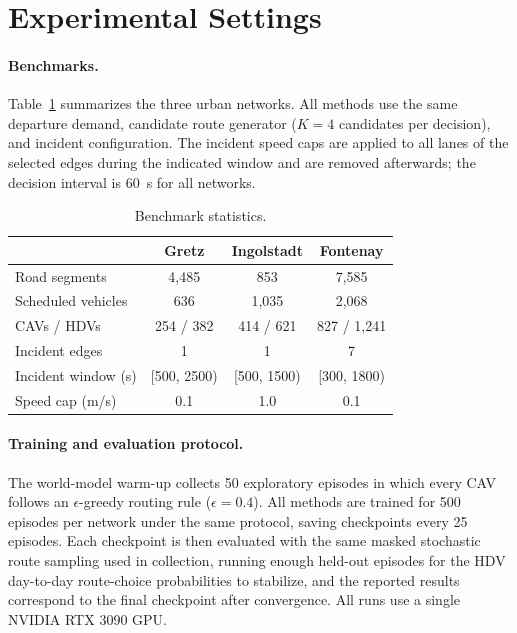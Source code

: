 

\section{Experimental Settings}
\label{app:exp-settings}

\paragraph{Benchmarks.}  Table~\ref{tab:benchmarks} summarizes the three urban
networks.  All methods use the same departure demand, candidate route
generator (\(K=4\) candidates per decision), and incident configuration.  The
incident speed caps are applied to all lanes of the selected edges during the
indicated window and are removed afterwards; the decision interval is 60~s
for all networks.

\begin{table}[h]
  \centering
  \caption{Benchmark statistics.}
  \renewcommand{\arraystretch}{1.0}
  \setlength{\tabcolsep}{6pt}
    \begin{tabular}{lccc}
      \toprule
      & Gretz & Ingolstadt & Fontenay \\
      \midrule
      Road segments & 4,485 & 853 & 7,585 \\
      Scheduled vehicles & 636 & 1,035 & 2,068 \\
      CAVs / HDVs & 254 / 382 & 414 / 621 & 827 / 1,241 \\
      Incident edges & 1 & 1 & 7 \\
      Incident window (s) & [500, 2500) & [500, 1500) & [300, 1800) \\
      Speed cap (m/s) & 0.1 & 1.0 & 0.1 \\
      \bottomrule
    \end{tabular}
  \label{tab:benchmarks}
\end{table}

\paragraph{Training and evaluation protocol.}  The world-model warm-up
collects 50 exploratory episodes in which every CAV follows an
\(\epsilon\)-greedy routing rule (\(\epsilon=0.4\)).  All methods are trained
for 500 episodes per network under the same protocol, saving checkpoints
every 25 episodes.  Each checkpoint is then evaluated with
the same masked stochastic route sampling used in collection, running enough
held-out episodes for the HDV day-to-day route-choice probabilities to
stabilize, and the reported results correspond to the final checkpoint after
convergence.  All runs use a single NVIDIA RTX 3090 GPU.

